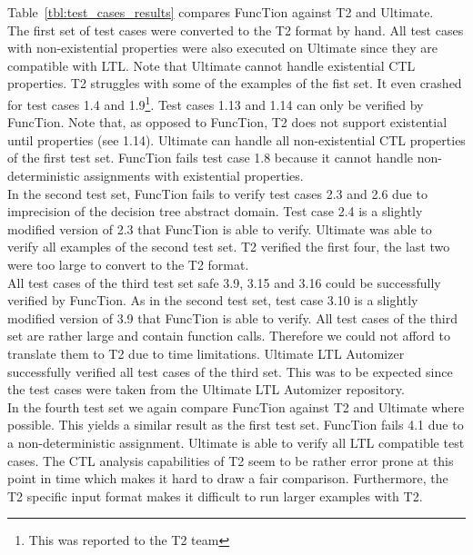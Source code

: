 \documentclass[11pt,a4paper,titlepage]{article}
\theoremstyle{definition}
\begin{document}
Table~\ref{tbl:test_cases_results} compares FuncTion against T2 and Ultimate.\\

The first set of test cases were converted to the T2 format by hand. 
All test cases with non-existential properties were also executed on Ultimate since they are compatible with LTL. 
Note that Ultimate cannot handle existential CTL properties.
T2 struggles with some of the examples of the fist set. It even crashed for test cases 1.4 and 1.9\footnote{This was reported to the T2 team}.  
Test cases 1.13 and 1.14 can only be verified by FuncTion. 
Note that, as opposed to FuncTion, T2 does not support existential \textsf{until} properties (see 1.14).
Ultimate can handle all non-existential CTL properties of the first test set. 
FuncTion fails test case 1.8 because it cannot handle non-deterministic assignments with existential properties.\\

In the second test set, FuncTion fails to verify test cases 2.3 and 2.6 due to imprecision of the decision tree abstract domain. 
Test case 2.4 is a slightly modified version of 2.3 that FuncTion is able to verify.
Ultimate was able to verify all examples of the second test set. 
T2 verified the first four, the last two were too large to convert to the T2 format.\\

All test cases of the third test set safe 3.9, 3.15 and 3.16 could be successfully verified by FuncTion. 
As in the second test set, test case 3.10 is a slightly modified version of 3.9 that FuncTion is able to verify.
All test cases of the third set are rather large and contain function calls. Therefore we could not afford to translate them
to T2 due to time limitations. Ultimate LTL Automizer successfully verified all test cases of the third set. 
This was to be expected since the test cases were taken from the Ultimate LTL Automizer repository.\\

In the fourth test set we again compare FuncTion against T2 and Ultimate where possible. 
This yields a similar result as the first test set. 
FuncTion fails 4.1 due to a non-deterministic assignment. 
Ultimate is able to verify all LTL compatible test cases.
The CTL analysis capabilities of T2 seem to be rather error prone at this 
point in time which makes it hard to draw a fair comparison.
Furthermore, the T2 specific input format makes it difficult to run larger examples with T2.\\
\end{document}
